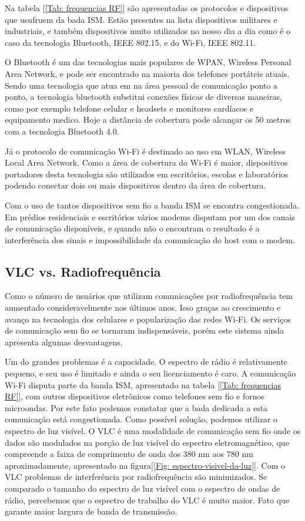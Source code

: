 Na tabela [\ref{Tab: frequencias RF}] são apresentadas os protocolos e dispositivos que usufruem da bada ISM. Estão presentes na lista dispositivos militares e industriais, e também dispositivos muito utilizados no nosso dia a dia como é o caso da tecnologia Bluetooth, IEEE 802.15, e do Wi-Fi, IEEE 802.11. 

O Bluetooth é  um das tecnologias mais populares de WPAN, Wireless Personal Area Network, e pode ser encontrado na maioria dos telefones portáteis atuais. 
Sendo uma tecnologia que atua em na área pessoal de comunicação ponto a ponto, a tecnologia bluetooth substitui conexões físicas de diversas maneiras, como por exemplo telefone celular e headsets e monitores cardíacos e equipamento medico.\cite{1368913}
Hoje a distância de cobertura pode alcançar os 50 metros com a tecnologia Bluetooth 4.0. \cite{Bluetooth}

Já o protocolo de comunicação Wi-Fi é destinado ao uso em WLAN, Wireless Local Area Network. Como a área de cobertura do Wi-Fi é maior, dispositivos portadores desta tecnologia são utilizados em escritórios, escolas e laboratórios podendo conectar dois ou mais dispositivos dentro da área de cobertura.

Com o uso de tantos dispositivos sem fio a banda ISM se encontra congestionada. Em prédios residenciais e escritórios vários modems disputam por um dos canais de comunicação disponíveis, e quando não o encontram o resultado é a interferência dos sinais e impossibilidade da comunicação do host com o modem.

\subsection{VLC vs. Radiofrequência}

Como o número de usuários que utilizam comunicações por radiofrequência tem aumentado consideravelmente nos últimos anos. Isso graças ao crescimento e avanço na tecnologia dos celulares e popularização das redes Wi-Fi. Os serviços de comunicação sem fio se tornaram indispensáveis, porém este sistema ainda apresenta algumas desvantagens.

Um do grandes problemas é a capacidade. O espectro de rádio é relativamente pequeno, e seu uso é limitado e ainda o seu licenciamento é caro. A comunicação Wi-Fi disputa parte da banda ISM, apresentado na tabela [\ref{Tab: frequencias RF}], com outros dispositivos eletrônicos como telefones sem fio e fornos microondas. Por este fato podemos constatar que a bada dedicada a esta comunicação está congestionada.\cite{boucheto.2006} Como possível solução, podemos utilizar o espectro de luz visível. O VLC é uma modalidade de comunicação sem fio onde os dados são modulados na porção de luz visível do espectro eletromagnético, que compreende a faixa de comprimento de onda dos 380 nm aos 780 nm aproximadamente, apresentado na figura[\ref{Fig: espectro-visivel-da-luz}]. Com o VLC problemas de interferência por radiofrequência são minimizados.
Se comparado o tamanho do espectro de luz visível com o espectro de ondas de rádio, percebemos que o espectro de trabalho do VLC é muito maior. Fato que garante maior largura de banda de transmissão.

